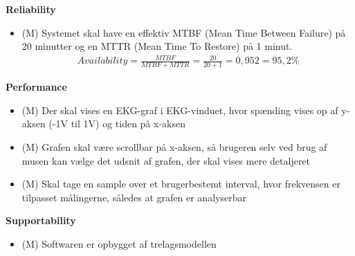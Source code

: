 \textbf{Reliability}
\begin{itemize}
	\item (M) Systemet skal have en effektiv MTBF (Mean Time Between Failure) på 20 minutter og en MTTR (Mean Time To Restore) på 1 minut.
				\begin{align}
					Availability = \frac{MTBF}{MTBF+MTTR} = \frac{20}{20+1} = 0,952 = 95,2 \%
				\end{align}

\end{itemize}

\textbf{Performance}
\begin{itemize}
	\item (M) Der skal vises en EKG-graf i EKG-vinduet, hvor spænding vises op af y-aksen (-1V til 1V) og tiden på x-aksen
	\item (M) Grafen skal være scrollbar på x-aksen, så brugeren selv ved brug af musen kan vælge det udsnit af grafen, der skal vises mere detaljeret
	\item (M) Skal tage en sample over et brugerbestemt interval, hvor frekvensen  er tilpasset målingerne, således at grafen er analyserbar
\end{itemize}

\textbf{Supportability}
\begin{itemize}
	\item (M) Softwaren er opbygget af trelagsmodellen
\end{itemize}
















